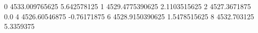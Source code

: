 0 4533.009765625 5.642578125
1 4529.4775390625 2.1103515625
2 4527.3671875 0.0
4 4526.60546875 -0.76171875
6 4528.9150390625 1.5478515625
8 4532.703125 5.3359375
